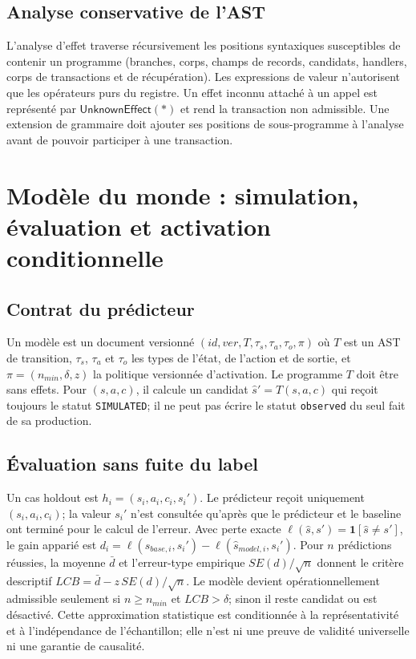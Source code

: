\documentclass[11pt,a4paper,openany]{book}
\newcommand{\code}[1]{\texttt{#1}}
\theoremstyle{definition}
\theoremstyle{plain}
\theoremstyle{remark}
\begin{document}
\section{Analyse conservative de l'AST}
L'analyse d'effet traverse récursivement les positions syntaxiques susceptibles de contenir un programme (branches, corps, champs de records, candidats, handlers, corps de transactions et de récupération). Les expressions de valeur n'autorisent que les opérateurs purs du registre. Un effet inconnu attaché à un appel est représenté par $\mathsf{UnknownEffect}(*)$ et rend la transaction non admissible. Une extension de grammaire doit ajouter ses positions de sous-programme à l'analyse avant de pouvoir participer à une transaction.

\chapter{Modèle du monde : simulation, évaluation et activation conditionnelle}
\section{Contrat du prédicteur}
Un modèle est un document versionné $(id,ver,T,\tau_s,\tau_a,\tau_o,\pi)$ où $T$ est un AST de transition, $\tau_s$, $\tau_a$ et $\tau_o$ les types de l'état, de l'action et de sortie, et $\pi=(n_{min},\delta,z)$ la politique versionnée d'activation. Le programme $T$ doit être sans effets. Pour $(s,a,c)$, il calcule un candidat $\hat{s}'=T(s,a,c)$ qui reçoit toujours le statut \code{SIMULATED}; il ne peut pas écrire le statut \code{observed} du seul fait de sa production.

\section{Évaluation sans fuite du label}
Un cas holdout est $h_i=(s_i,a_i,c_i,s_i')$. Le prédicteur reçoit uniquement $(s_i,a_i,c_i)$; la valeur $s_i'$ n'est consultée qu'après que le prédicteur et le baseline ont terminé pour le calcul de l'erreur. Avec perte exacte $\ell(\hat{s},s')=\mathbf{1}[\hat{s}\neq s']$, le gain apparié est $d_i=\ell(\hat{s}_{base,i},s_i')-\ell(\hat{s}_{model,i},s_i')$. Pour $n$ prédictions réussies, la moyenne $\bar d$ et l'erreur-type empirique $SE(d)/\sqrt{n}$ donnent le critère descriptif $LCB=\bar d-z\,SE(d)/\sqrt n$. Le modèle devient opérationnellement admissible seulement si $n\geq n_{min}$ et $LCB>\delta$; sinon il reste candidat ou est désactivé. Cette approximation statistique est conditionnée à la représentativité et à l'indépendance de l'échantillon; elle n'est ni une preuve de validité universelle ni une garantie de causalité.
\end{document}
